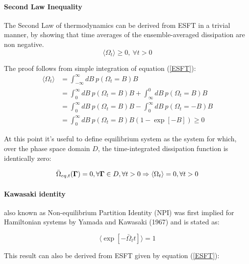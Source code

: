 \documentclass[a4paper,12pt,nofootinbib]{article}
\begin{document}
\paragraph{Second Law Inequality}
The Second Law of thermodynamics can be derived from ESFT in a trivial manner, by showing that time averages of the ensemble-averaged dissipation are non negative.
\begin{equation}
  \langle\Omega_t\rangle\geq 0,\  \forall t > 0
\end{equation}

 The proof follows from simple integration of equation (\ref{ESFT}):
\begin{equation}
\begin{aligned}
  \langle \Omega_t \rangle &= \int_{-\infty}^{\infty} dB\ p(\Omega_t=B)B\\
  &=\int_0^{\infty} dB\ p(\Omega_t=B)B +\int_{\infty}^{0} dB\ p(\Omega_t=B)B \\
  &=\int_0^{\infty} dB\ p(\Omega_t=B)B -\int_{0}^{\infty} dB\ p(\Omega_t=-B)B \\
  &= \int_0^{\infty} dB\ p(\Omega_t=B)B(1-\exp[-B]) \geq 0 
\end{aligned}
\end{equation} 

At this point it's useful to define equilibrium system as the system for which, over the phase space domain $D$, the time-integrated dissipation function is identically zero:

\begin{equation}
  \bar{\Omega}_{eq,t}(\bm{\Gamma})=0, \forall\bm{\Gamma}\in  D, \forall t >0 \\
  \Rightarrow \langle \Omega_t \rangle = 0, \forall t > 0
\end{equation}


\paragraph{Kawasaki identity}

also known as Non-equilibrium Partition Identity (NPI) was first implied for Hamiltonian systems by Yamada and Kawasaki (1967) \cite{Anonymous:1967fr} and is stated as:

\begin{equation}
  \langle \exp[-\bar{\Omega}_t t] \rangle =1
\end{equation}

This result can also be derived from ESFT given by equation (\ref{ESFT}):
\end{document}
